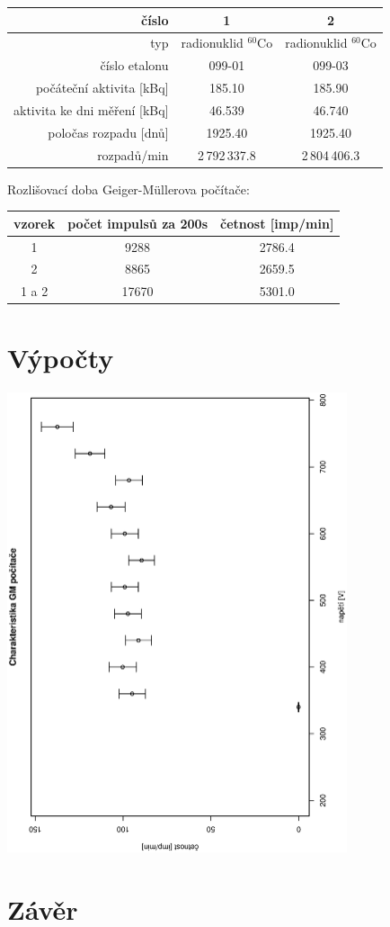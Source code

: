 \documentclass[10pt]{article}
\begin{document}
\begin{center}
\begin{tabular}{|r|c|c|}
\hline
číslo & 1 & 2 \\
\hline
typ   & radionuklid $^{60}$Co & radionuklid $^{60}$Co \\
číslo etalonu & 099-01 & 099-03 \\
počáteční aktivita [kBq] & 185.10 & 185.90 \\
aktivita ke dni měření [kBq] & 46.539 & 46.740 \\
poločas rozpadu [dnů] & 1925.40 & 1925.40 \\
rozpadů/min & 2\,792\,337.8 & 2\,804\,406.3 \\
\hline
\end{tabular}
\end{center}

\vspace{.5cm}
\noindent
Rozlišovací doba Geiger-M\"ullerova počítače:

\begin{center}
\begin{tabular}{|c|c|c|}
\hline
vzorek & počet impulsů za 200s & četnost [imp/min] \\
\hline
1      & 9288  & 2786.4 \\
2      & 8865  & 2659.5 \\
1 a 2  & 17670 & 5301.0 \\
\hline
\end{tabular}
\end{center}


\section{Výpočty}
\begin{center}
\includegraphics[width=10cm,angle=270]{charakteristika.eps}
\end{center}

\section{Závěr} 
\end{document}
